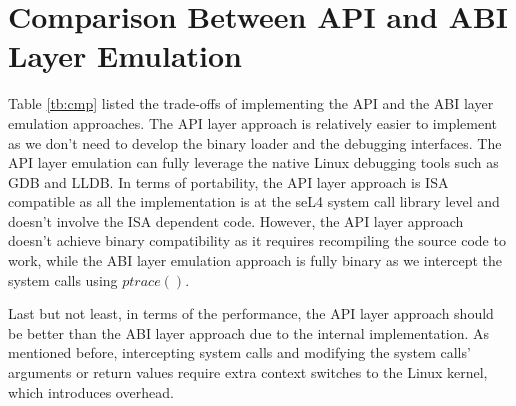 \section{Comparison Between API and ABI Layer Emulation}

Table \ref{tb:cmp} listed the trade-offs of implementing the API and the ABI layer emulation approaches. The API layer approach is relatively easier to implement as we don't need to develop the binary loader and the debugging interfaces. The API layer emulation can fully leverage the native Linux debugging tools such as GDB and LLDB. In terms of portability, the API layer approach is ISA compatible as all the implementation is at the seL4 system call library level and doesn't involve the ISA dependent code. However, the API layer approach doesn't achieve binary compatibility as it requires recompiling the source code to work, while the ABI layer emulation approach is fully binary as we intercept the system calls using $ptrace()$.

Last but not least, in terms of the performance, the API layer approach should be better than the ABI layer approach due to the internal implementation. As mentioned before, intercepting system calls and modifying the system calls' arguments or return values require extra context switches to the Linux kernel, which introduces overhead.


